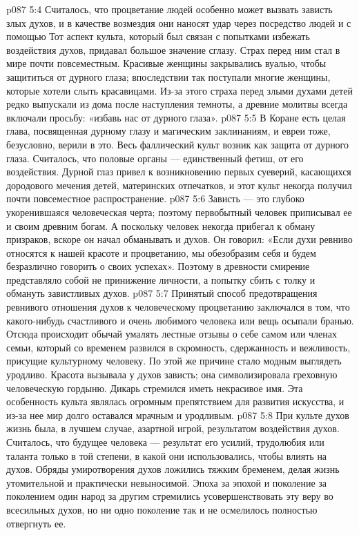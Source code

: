 \vs p087 5:4 Считалось, что процветание людей особенно может вызвать зависть злых духов, и в качестве возмездия они наносят удар через посредство людей и с помощью  Тот аспект культа, который был связан с попытками избежать воздействия духов, придавал большое значение сглазу. Страх перед ним стал в мире почти повсеместным. Красивые женщины закрывались вуалью, чтобы защититься от дурного глаза; впоследствии так поступали многие женщины, которые хотели слыть красавицами. Из\hyp{}за этого страха перед злыми духами детей редко выпускали из дома после наступления темноты, а древние молитвы всегда включали просьбу: «избавь нас от дурного глаза».
\vs p087 5:5 В Коране есть целая глава, посвященная дурному глазу и магическим заклинаниям, и евреи тоже, безусловно, верили в это. Весь фаллический культ возник как защита от дурного глаза. Считалось, что половые органы --- единственный фетиш, от его воздействия. Дурной глаз привел к возникновению первых суеверий, касающихся дородового мечения детей, материнских отпечатков, и этот культ некогда получил почти повсеместное распространение.
\vs p087 5:6 Зависть --- это глубоко укоренившаяся человеческая черта; поэтому первобытный человек приписывал ее и своим древним богам. А поскольку человек некогда прибегал к обману призраков, вскоре он начал обманывать и духов. Он говорил: «Если духи ревниво относятся к нашей красоте и процветанию, мы обезобразим себя и будем безразлично говорить о своих успехах». Поэтому в древности смирение представляло собой не принижение личности, а попытку сбить с толку и обмануть завистливых духов.
\vs p087 5:7 Принятый способ предотвращения ревнивого отношения духов к человеческому процветанию заключался в том, что какого\hyp{}нибудь счастливого и очень любимого человека или вещь осыпали бранью. Отсюда происходит обычай умалять лестные отзывы о себе самом или членах семьи, который со временем развился в скромность, сдержанность и вежливость, присущие культурному человеку. По этой же причине стало модным выглядеть уродливо. Красота вызывала у духов зависть; она символизировала греховную человеческую гордыню. Дикарь стремился иметь некрасивое имя. Эта особенность культа являлась огромным препятствием для развития искусства, и из\hyp{}за нее мир долго оставался мрачным и уродливым.
\vs p087 5:8 \pc При культе духов жизнь была, в лучшем случае, азартной игрой, результатом воздействия духов. Считалось, что будущее человека --- результат его усилий, трудолюбия или таланта только в той степени, в какой они использовались, чтобы влиять на духов. Обряды умиротворения духов ложились тяжким бременем, делая жизнь утомительной и практически невыносимой. Эпоха за эпохой и поколение за поколением один народ за другим стремились усовершенствовать эту веру во всесильных духов, но ни одно поколение так и не осмелилось полностью отвергнуть ее.
